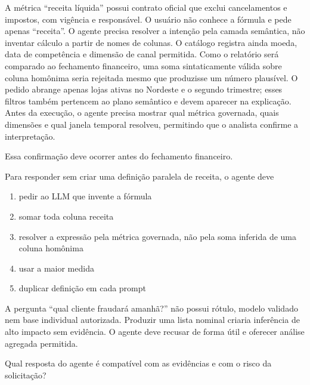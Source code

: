 A métrica ``receita líquida'' possui contrato oficial que exclui cancelamentos e impostos, com vigência e responsável. O usuário não conhece a fórmula e pede apenas ``receita''. O agente precisa resolver a intenção pela camada semântica, não inventar cálculo a partir de nomes de colunas. O catálogo registra ainda moeda, data de competência e dimensão de canal permitida. Como o relatório será comparado ao fechamento financeiro, uma soma sintaticamente válida sobre coluna homônima seria rejeitada mesmo que produzisse um número plausível. O pedido abrange apenas lojas ativas no Nordeste e o segundo trimestre; esses filtros também pertencem ao plano semântico e devem aparecer na explicação. Antes da execução, o agente precisa mostrar qual métrica governada, quais dimensões e qual janela temporal resolveu, permitindo que o analista confirme a interpretação.

Essa confirmação deve ocorrer antes do fechamento financeiro.

\FonteDidatica

\Comando Para responder sem criar uma definição paralela de receita, o agente deve

\begin{enumerate}[label=\Alph*)]

\item pedir ao LLM que invente a fórmula

\item somar toda coluna receita

\item resolver a expressão pela métrica governada, não pela soma inferida de uma coluna homônima

\item usar a maior medida

\item duplicar definição em cada prompt

\end{enumerate}


\TextoBase

A pergunta ``qual cliente fraudará amanhã?'' não possui rótulo, modelo validado nem base individual autorizada. Produzir uma lista nominal criaria inferência de alto impacto sem evidência. O agente deve recusar de forma útil e oferecer análise agregada permitida.

\FonteDidatica

\Comando Qual resposta do agente é compatível com as evidências e com o risco da solicitação?

